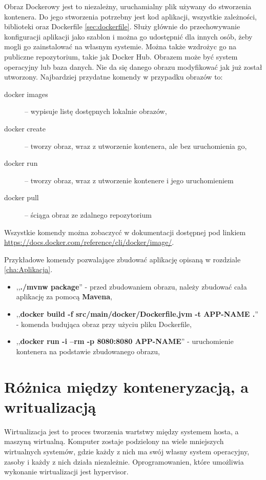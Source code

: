 \documentclass{iiuwb}
\begin{document}
Obraz Dockerowy jest to niezależny, uruchamialny plik używany do stworzenia kontenera. Do jego stworzenia potrzebny jest kod aplikacji, wszystkie zależności, biblioteki oraz Dockerfile \ref{sec:dockerfile}. Służy głównie do przechowywanie konfiguracji aplikacji jako szablon i można go udostępnić dla innych osób, żeby mogli go zainstalować na własnym systemie. Można także wzdrożyc go na publiczne repozytorium, takie jak Docker Hub. Obrazem może być system operacyjny lub baza danych. Nie da się danego obrazu modyfikować jak już został utworzony.
\newline
Najbardziej przydatne komendy w przypadku obrazów to:
\begin{description}
  \item[docker images] -- wypisuje listę dostępnych lokalnie obrazów,
  \item[docker create] -- tworzy obraz, wraz z utworzenie kontenera, ale bez uruchomienia go,
  \item[docker run] -- tworzy obraz, wraz z utworzenie kontenere i jego uruchomieniem
  \item[docker pull] -- ściąga obraz ze zdalnego repozytorium
\end{description}
Wszystkie komendy można zobaczycć w dokumentacji dostępnej pod linkiem \newline
\url{https://docs.docker.com/reference/cli/docker/image/}.
\newline

Przykładowe komendy pozwalające zbudować aplikację opisaną w rozdziale \ref{cha:Aplikacja}.

\begin{itemize}
    \item ,,\textbf{./mvnw package}'' - przed zbudowaniem obrazu, należy zbudować cała aplikację za pomocą \textbf{Mavena}, 
    \item ,,\textbf{docker build -f src/main/docker/Dockerfile.jvm -t APP-NAME .}'' - komenda budująca obraz przy użyciu pliku Dockerfile, 
    \item ,,\textbf{docker run -i --rm -p 8080:8080 APP-NAME}'' -  uruchomienie kontenera na podstawie zbudowanego obrazu, 
\end{itemize}

\section{Różnica między konteneryzacją, a writualizacją}

Wirtualizacja jest to proces tworzenia wartstwy między systemem hosta, a maszyną wirtualną. Komputer zostaje podzielony na wiele mniejszych wirtualnych systemów, gdzie każdy z nich ma swój własny system operacyjny, zasoby i każdy z nich działa niezależnie. Oprogramowanien, które umożliwia wykonanie wirtualizacji jest hypervisor.
\end{document}
